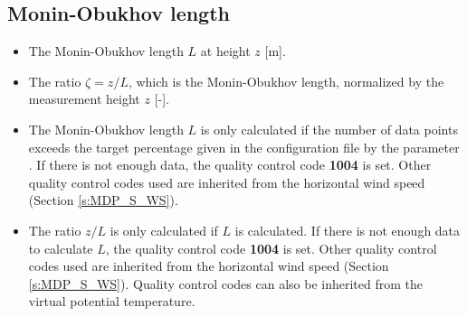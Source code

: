 \subsection{Monin-Obukhov length} 
\begin{itemize}
\item {} The Monin-Obukhov length $L$ at height $z$ [m].
\item {} The ratio $\zeta = z / L$, which is the Monin-Obukhov length, normalized by the measurement height $z$ [-].
\item {} The Monin-Obukhov length $L$ is only calculated if the number of data points exceeds the target percentage given in the configuration file by the parameter . If there is not enough data, the quality control code \textbf{1004} is set. Other quality control codes used are inherited from the horizontal wind speed (Section \ref{s:MDP_S_WS}).
\item {} The ratio $z/L$ is only calculated if $L$ is calculated. If there is not enough data to calculate $L$, the quality control code \textbf{1004} is set. Other quality control codes used are inherited from the horizontal wind speed (Section \ref{s:MDP_S_WS}). Quality control codes can also be inherited from the virtual potential temperature.
\end{itemize}

